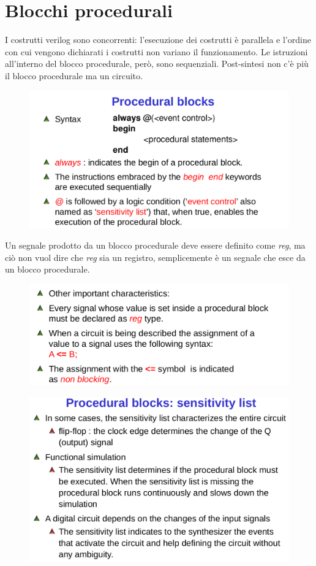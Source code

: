 \documentclass{book}
\begin{document}
    \section{Blocchi procedurali}
        I costrutti verilog sono concorrenti: l'esecuzione dei costrutti è parallela e l'ordine con cui vengono dichiarati i costrutti non variano il funzionamento. Le istruzioni all'interno del blocco procedurale, però, sono sequenziali. Post-sintesi non c'è più il blocco procedurale ma un circuito.\\
        \begin{figure}[h!]
            \centering
            \includegraphics[width=0.60\linewidth]{img/chapt7img4.png}
        \end{figure}
        Un segnale prodotto da un blocco procedurale deve essere definito come \textit{reg}, ma ciò non vuol dire che \textit{reg} sia un registro, semplicemente è un segnale che esce da un blocco procedurale.
        \begin{figure}[h!]
            \centering
            \includegraphics[width=0.5\linewidth]{img/chapt7img5.png}
        \end{figure}
        \begin{figure}[h!]
            \centering
            \includegraphics[width=0.5\linewidth]{img/chapt7img6.png}
        \end{figure} \newpage
\end{document}
